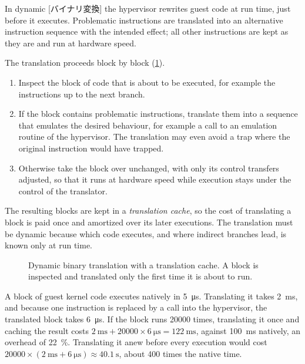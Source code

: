 \documentclass[../main.tex]{subfiles}
\begin{document}
\begin{definition}
  In dynamic [バイナリ変換] the hypervisor rewrites
  guest code at run time, just before it executes.  Problematic
  instructions are translated into an alternative instruction sequence
  with the intended effect; all other instructions are kept as they are
  and run at hardware speed.
\end{definition}

The translation proceeds block by block (\cref{fig:l12-bt}).
\begin{enumerate}
  \item Inspect the block of code that is about to be executed, for
    example the instructions up to the next branch.
  \item If the block contains problematic instructions, translate them into
    a sequence that emulates the desired behaviour, for example a call to
    an emulation routine of the hypervisor.  The translation may even avoid
    a trap where the original instruction would have trapped.
  \item Otherwise take the block over unchanged, with only its control
    transfers adjusted, so that it runs at hardware speed while execution
    stays under the control of the translator.
\end{enumerate}
The resulting blocks are kept in a \emph{translation cache}, so the cost of
translating a block is paid once and amortized over its later
executions.
The translation must be dynamic because which code executes, and where
indirect branches lead, is known only at run time.

\begin{figure}[htbp]
  \centering
  
  \caption{Dynamic binary translation with a translation cache.  A block is
    inspected and translated only the first time it is about to run.}
  \label{fig:l12-bt}
\end{figure}

\begin{example}
  A block of guest kernel code executes natively in
  \SI{5}{\micro\second}.  Translating it takes \SI{2}{\milli\second}, and
  because one instruction
  is replaced by a call into the hypervisor, the translated block takes
  \SI{6}{\micro\second}.  If the block runs \num{20000} times, translating
  it once and caching the result costs
  $\SI{2}{\milli\second} + \num{20000}\times\SI{6}{\micro\second} =
  \SI{122}{\milli\second}$, against \SI{100}{\milli\second} natively, an
  overhead of \SI{22}{\percent}.  Translating it anew before every
  execution would cost
  $\num{20000}\times(\SI{2}{\milli\second}+\SI{6}{\micro\second}) \approx
  \SI{40.1}{\second}$, about 400 times the native time.
\end{example}
\end{document}
